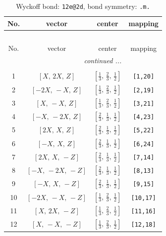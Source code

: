 \documentclass[fleqn,8pt]{jsarticle}
\begin{document}
\renewcommand{\arraystretch}{1.2}
\begin{longtable}{cccc}
\caption{Wyckoff bond: {\tt 12e@2d}, bond symmetry: {\tt .m.}}
 \\
 \hline \hline
No. & vector & center & mapping \\ \hline \endfirsthead

\multicolumn{3}{l}{\tablename\ \thetable{}} \\
 \hline \hline
No. & vector & center & mapping \\ \hline \endhead

 \hline \hline
\multicolumn{3}{r}{\footnotesize\it continued ...} \\ \endfoot

 \hline \hline
\multicolumn{3}{r}{} \\ \endlastfoot

1 & $\left[ X,\, 2 X,\, Z \right]$ & $\left[ \frac{1}{3},\, \frac{2}{3},\, \frac{1}{2} \right]$ & {\tt [1,20]} \\ \hline
2 & $\left[ - 2 X,\, - X,\, Z \right]$ & $\left[ \frac{1}{3},\, \frac{2}{3},\, \frac{1}{2} \right]$ & {\tt [2,19]} \\ \hline
3 & $\left[ X,\, - X,\, Z \right]$ & $\left[ \frac{1}{3},\, \frac{2}{3},\, \frac{1}{2} \right]$ & {\tt [3,21]} \\ \hline
4 & $\left[ - X,\, - 2 X,\, Z \right]$ & $\left[ \frac{2}{3},\, \frac{1}{3},\, \frac{1}{2} \right]$ & {\tt [4,23]} \\ \hline
5 & $\left[ 2 X,\, X,\, Z \right]$ & $\left[ \frac{2}{3},\, \frac{1}{3},\, \frac{1}{2} \right]$ & {\tt [5,22]} \\ \hline
6 & $\left[ - X,\, X,\, Z \right]$ & $\left[ \frac{2}{3},\, \frac{1}{3},\, \frac{1}{2} \right]$ & {\tt [6,24]} \\ \hline
7 & $\left[ 2 X,\, X,\, - Z \right]$ & $\left[ \frac{2}{3},\, \frac{1}{3},\, \frac{1}{2} \right]$ & {\tt [7,14]} \\ \hline
8 & $\left[ - X,\, - 2 X,\, - Z \right]$ & $\left[ \frac{2}{3},\, \frac{1}{3},\, \frac{1}{2} \right]$ & {\tt [8,13]} \\ \hline
9 & $\left[ - X,\, X,\, - Z \right]$ & $\left[ \frac{2}{3},\, \frac{1}{3},\, \frac{1}{2} \right]$ & {\tt [9,15]} \\ \hline
10 & $\left[ - 2 X,\, - X,\, - Z \right]$ & $\left[ \frac{1}{3},\, \frac{2}{3},\, \frac{1}{2} \right]$ & {\tt [10,17]} \\ \hline
11 & $\left[ X,\, 2 X,\, - Z \right]$ & $\left[ \frac{1}{3},\, \frac{2}{3},\, \frac{1}{2} \right]$ & {\tt [11,16]} \\ \hline
12 & $\left[ X,\, - X,\, - Z \right]$ & $\left[ \frac{1}{3},\, \frac{2}{3},\, \frac{1}{2} \right]$ & {\tt [12,18]} \\
\end{longtable}
\end{document}
